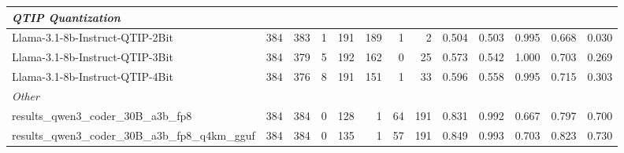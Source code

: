 \begin{table}[htbp]
{\begin{tabular}{lrrrrrrrrrrrr}
    \midrule
    \multicolumn{13}{l}{\textit{QTIP Quantization}} \\
    \midrule
    Llama-3.1-8b-Instruct-QTIP-2Bit & 384 & 383 & 1 & 191 & 189 & 1 & 2 & 0.504 & 0.503 & 0.995 & 0.668 & 0.030 \\
    Llama-3.1-8b-Instruct-QTIP-3Bit & 384 & 379 & 5 & 192 & 162 & 0 & 25 & 0.573 & 0.542 & 1.000 & 0.703 & 0.269 \\
    Llama-3.1-8b-Instruct-QTIP-4Bit & 384 & 376 & 8 & 191 & 151 & 1 & 33 & 0.596 & 0.558 & 0.995 & 0.715 & 0.303 \\
    \midrule
    \multicolumn{13}{l}{\textit{Other}} \\
    \midrule
    results\_qwen3\_coder\_30B\_a3b\_fp8 & 384 & 384 & 0 & 128 & 1 & 64 & 191 & 0.831 & 0.992 & 0.667 & 0.797 & 0.700 \\
    results\_qwen3\_coder\_30B\_a3b\_fp8\_q4km\_gguf & 384 & 384 & 0 & 135 & 1 & 57 & 191 & 0.849 & 0.993 & 0.703 & 0.823 & 0.730 \\
    \bottomrule
  \end{tabular}
  }
\end{table}

